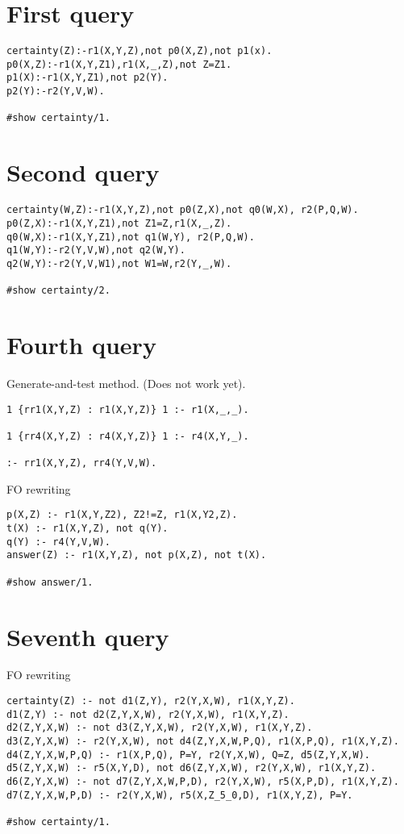 
\section{First query}

\begin{lstlisting}
certainty(Z):-r1(X,Y,Z),not p0(X,Z),not p1(x).
p0(X,Z):-r1(X,Y,Z1),r1(X,_,Z),not Z=Z1.
p1(X):-r1(X,Y,Z1),not p2(Y).
p2(Y):-r2(Y,V,W).

#show certainty/1.
\end{lstlisting}

\section{Second query}

\begin{lstlisting}
certainty(W,Z):-r1(X,Y,Z),not p0(Z,X),not q0(W,X), r2(P,Q,W).
p0(Z,X):-r1(X,Y,Z1),not Z1=Z,r1(X,_,Z).
q0(W,X):-r1(X,Y,Z1),not q1(W,Y), r2(P,Q,W).
q1(W,Y):-r2(Y,V,W),not q2(W,Y).
q2(W,Y):-r2(Y,V,W1),not W1=W,r2(Y,_,W).

#show certainty/2.
\end{lstlisting}

\section{Fourth query}

Generate-and-test method. (Does not work yet).

\begin{lstlisting}
1 {rr1(X,Y,Z) : r1(X,Y,Z)} 1 :- r1(X,_,_).

1 {rr4(X,Y,Z) : r4(X,Y,Z)} 1 :- r4(X,Y,_).

:- rr1(X,Y,Z), rr4(Y,V,W). 
\end{lstlisting}


FO rewriting

\begin{lstlisting}
p(X,Z) :- r1(X,Y,Z2), Z2!=Z, r1(X,Y2,Z).
t(X) :- r1(X,Y,Z), not q(Y).
q(Y) :- r4(Y,V,W).
answer(Z) :- r1(X,Y,Z), not p(X,Z), not t(X).

#show answer/1.
\end{lstlisting}

\section{Seventh query}


FO rewriting

\begin{lstlisting}
certainty(Z) :- not d1(Z,Y), r2(Y,X,W), r1(X,Y,Z).
d1(Z,Y) :- not d2(Z,Y,X,W), r2(Y,X,W), r1(X,Y,Z).
d2(Z,Y,X,W) :- not d3(Z,Y,X,W), r2(Y,X,W), r1(X,Y,Z).
d3(Z,Y,X,W) :- r2(Y,X,W), not d4(Z,Y,X,W,P,Q), r1(X,P,Q), r1(X,Y,Z).
d4(Z,Y,X,W,P,Q) :- r1(X,P,Q), P=Y, r2(Y,X,W), Q=Z, d5(Z,Y,X,W).
d5(Z,Y,X,W) :- r5(X,Y,D), not d6(Z,Y,X,W), r2(Y,X,W), r1(X,Y,Z).
d6(Z,Y,X,W) :- not d7(Z,Y,X,W,P,D), r2(Y,X,W), r5(X,P,D), r1(X,Y,Z).
d7(Z,Y,X,W,P,D) :- r2(Y,X,W), r5(X,Z_5_0,D), r1(X,Y,Z), P=Y.

#show certainty/1.
\end{lstlisting}

